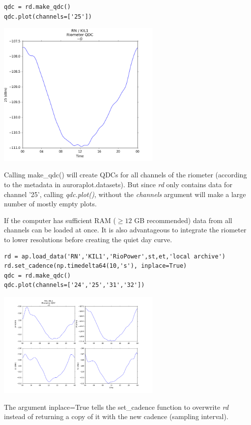 \documentclass{article}
\begin{document}
\begin{lstlisting}[style=pythonstyle]
qdc = rd.make_qdc()
qdc.plot(channels=['25'])
\end{lstlisting}

\includegraphics[width=8cm]{images/figure_2.png}


Calling make\_qdc() will create QDCs for all channels of the riometer (according to the metadata in auroraplot.datasets). But since {\it rd} only contains data for channel '25', calling {\it qdc.plot()}, without the {\it channels} argument will make a large number of mostly empty plots.

If the computer has sufficient RAM ($\ge 12$ GB recommended) data from all channels can be loaded at once. It is also advantageous to integrate the riometer to lower resolutions before creating the quiet day curve.

\begin{lstlisting}[style=pythonstyle]
rd = ap.load_data('RN','KIL1','RioPower',st,et,'local archive')
rd.set_cadence(np.timedelta64(10,'s'), inplace=True)
qdc = rd.make_qdc()
qdc.plot(channels=['24','25','31','32'])
\end{lstlisting}

\includegraphics[width=8cm]{images/figure_3.png}


\noindent The argument inplace=True tells the set\_cadence function to overwrite {\it rd} instead of returning a copy of it with the new cadence (sampling interval).
\end{document}
